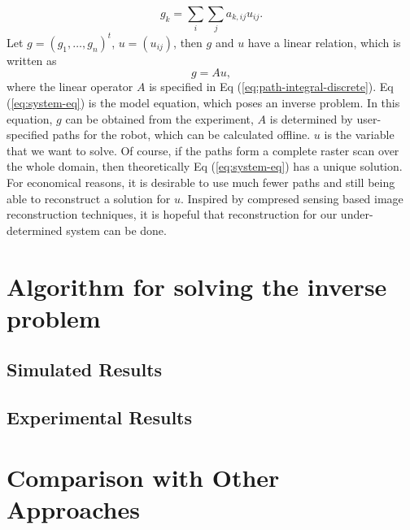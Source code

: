 \documentclass[english]{article}\usepackage[]{graphicx}\usepackage[]{color}
\begin{document}
\begin{equation}
g_{k}=\sum_{i}\sum_{j}a_{k,ij}u_{ij}.\label{eq:path-integral-discrete}
\end{equation}
Let $g=(g_{1},\ldots,g_{n})^{t}$, $u=(u_{ij})$, then $g$ and $u$
have a linear relation, which is written as 
\begin{equation}
g=Au,\label{eq:system-eq}
\end{equation}
where the linear operator $A$ is specified in Eq (\ref{eq:path-integral-discrete}).
Eq (\ref{eq:system-eq}) is the model equation, which poses an inverse
problem. In this equation, $g$ can be obtained from the experiment,
$A$ is determined by user-specified paths for the robot, which can
be calculated offline. $u$ is the variable that we want to solve.
Of course, if the paths form a complete raster scan over the whole
domain, then theoretically Eq (\ref{eq:system-eq}) has a unique solution.
For economical reasons, it is desirable to use much fewer paths and
still being able to reconstruct a solution for $u$. Inspired by compresed
sensing based image reconstruction techniques, it is hopeful that
reconstruction for our under-determined system can be done.

\section{Algorithm for solving the inverse problem}

\subsection{Simulated Results}
\label{sec:simresults}
\subsection{Experimental Results}

\section{Comparison with Other Approaches}

\end{document}
